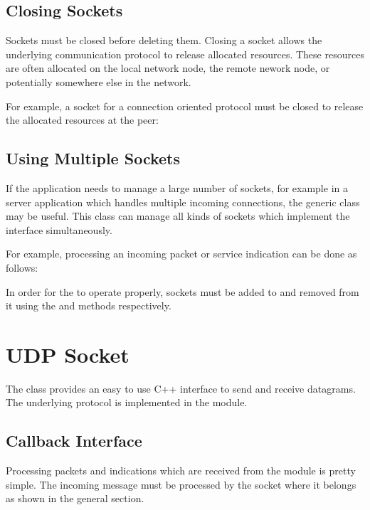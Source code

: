 \subsection*{Closing Sockets}

Sockets must be closed before deleting them. Closing a socket allows the
underlying communication protocol to release allocated resources. These
resources are often allocated on the local network node, the remote nework node,
or potentially somewhere else in the network.

For example, a socket for a connection oriented protocol must be closed to
release the allocated resources at the peer:


\subsection*{Using Multiple Sockets}

If the application needs to manage a large number of sockets, for example in a
server application which handles multiple incoming connections, the generic
 class may be useful. This class can manage all kinds of
sockets which implement the  interface simultaneously.

For example, processing an incoming packet or service indication can be done as
follows:


In order for the  to operate properly, sockets must be added
to and removed from it using the  and 
methods respectively.

\section{UDP Socket}
\label{sec:sockets:udp-socket}

The  class provides an easy to use C++ interface to send and
receive  datagrams. The underlying  protocol is
implemented in the  module.

\subsection*{Callback Interface}

Processing packets and indications which are received from the 
module is pretty simple. The incoming message must be processed by the socket
where it belongs as shown in the general section.

